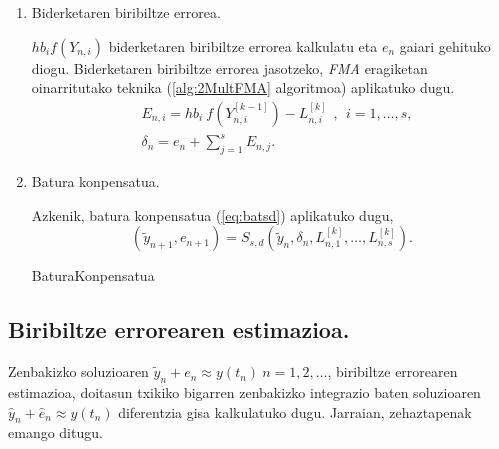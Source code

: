 \begin{enumerate}
\item Biderketaren biribiltze errorea.

$hb_i f(Y_{n,i})$ biderketaren biribiltze errorea kalkulatu eta $e_{n}$ gaiari gehituko diogu. Biderketaren biribiltze errorea jasotzeko,  \emph{FMA} eragiketan oinarritutako teknika (\ref{alg:2MultFMA} algoritmoa) aplikatuko dugu. 
\begin{align*}
&E_{n,i}=hb_i \ f(Y^{[k-1]}_{n,i}) - L^{[k]}_{n,i} \ \ , \ \ i=1,\dots,s,\\
&\delta_{n}={e}_{n} + \sum\limits_{j=1}^{s}E_{n,j}.
\end{align*}


\item Batura konpensatua.

Azkenik, batura konpensatua (\ref{eq:batsd}) aplikatuko dugu,
\begin{equation}
\label{eq:bkLn}
(\tilde y_{n+1}, e_{n+1}) = S_{s,d}(\tilde y_n, \delta_n, L_{n,1}^{[k]}, \dots,L_{n,s}^{[k]}).
\end{equation}

\begin{algorithm}[H]
  \SetAlgoLined\DontPrintSemicolon
  \caption{BaturaKonpensatua}
\end{algorithm} 

\end{enumerate}


\subsection{Biribiltze errorearen estimazioa.}
\label{ss:634}

Zenbakizko soluzioaren $\tilde{y}_n+e_n \approx y(t_n) \ n=1,2,\dots$, biribiltze errorearen estimazioa, doitasun txikiko  bigarren zenbakizko integrazio baten soluzioaren $\hat{y}_n+\hat{e}_n \approx y(t_n)$ diferentzia gisa kalkulatuko dugu.  Jarraian, zehaztapenak emango ditugu.


